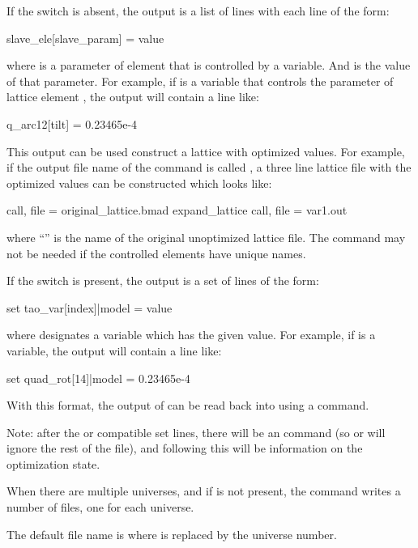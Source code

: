{{{{{{{{{{{If the  switch is absent, the output is a list of lines with each line of the form:
\begin{example}
  slave_ele[slave_param] = value
\end{example}
where  is a parameter of \bmad element  that is controlled by a \tao
variable. And  is the value of that parameter. For example, if  is a \tao
variable that controls the  parameter of \bmad lattice element , the output
will contain a line like:
\begin{example}
  q_arc12[tilt] = 0.23465e-4
\end{example}
This output can be used construct a lattice with optimized values. For example, if the output file
name of the  command is called , a three line lattice file with the
optimized values can be constructed which looks like:
\begin{example}
  call, file = original_lattice.bmad
  expand_lattice
  call, file = var1.out
\end{example}
where ``'' is the name of the original unoptimized lattice file. The
 command may not be needed if the controlled \bmad elements have unique names.

If the  switch is present, the output is a set of lines of the form:
\begin{example}
  set tao_var[index]|model = value
\end{example}
where  designates a \tao variable which has the given  value. For
example, if  is a \tao variable, the output
will contain a line like:
\begin{example}
  set quad_rot[14]|model = 0.23465e-4
\end{example}
With this format, the output of  can be read back into \tao using a 
command.

Note: after the \bmad or \tao compatible set lines, there will be an  command (so \bmad
or \tao will ignore the rest of the file), and following this will be information on the
optimization state.

When there are multiple universes, and if  is not present, the 
command writes a number of files, one for each universe.

The default file name is  where \vn{\#} is replaced by the universe number. 

}}}}}}}}}}}
